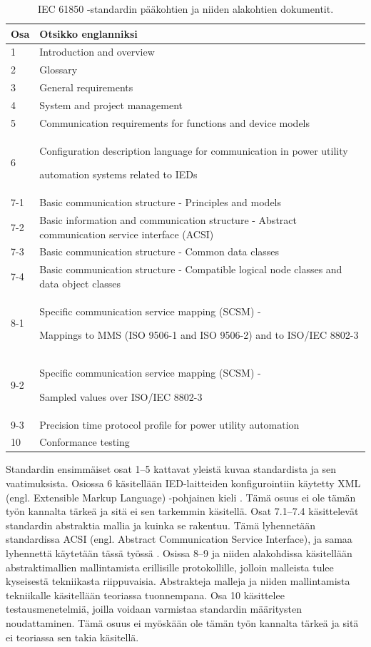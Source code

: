 \begin{table}[ht!]
	\caption{IEC 61850 -standardin pääkohtien ja niiden alakohtien dokumentit.}
	\label{tab:iec61850-dokumentin-osat}
	\begin{tabular}{l | l}
		\hline
		\textbf{Osa} & \textbf{Otsikko englanniksi} \\
		\hline \hline
		1 & Introduction and overview \\
		2 & Glossary \\
		3 & General requirements \\
		4 & System and project management \\
		5 & \parbox[t]{13cm}{Communication requirements for functions and device models} \\
		6 & \parbox[t]{13cm}{Configuration description language for communication in power utility \par automation systems related to IEDs} \\
		7-1 & \parbox[t]{13cm}{Basic communication structure - Principles and models} \\
		7-2 & \parbox[t]{13cm}{Basic information and communication structure - Abstract communication service interface (ACSI)} \\
		7-3 & \parbox[t]{13cm}{Basic communication structure - Common data classes} \\
		7-4 & \parbox[t]{13cm}{Basic communication structure - Compatible logical node classes and data object classes} \\
		8-1 & \parbox[t]{13cm}{Specific communication service mapping (SCSM) - \par  Mappings to MMS (ISO 9506-1 and ISO 9506-2) and to ISO/IEC 8802-3} \\
		9-2 & \parbox[t]{13cm}{Specific communication service mapping (SCSM) - \par  Sampled values over ISO/IEC 8802-3} \\
		9-3 & \parbox[t]{13cm}{Precision time protocol profile for power utility automation} \\
		10 & Conformance testing \\
		\hline
	\end{tabular}
\end{table}

Standardin ensimmäiset osat 1--5 kattavat yleistä kuvaa standardista ja sen vaatimuksista. Osiossa 6 käsitellään IED-laitteiden konfigurointiin käytetty XML (engl. Extensible Markup Language) -pohjainen kieli \cite[s.~7--8]{IEC61850-6}. Tämä osuus ei ole tämän työn kannalta tärkeä ja sitä ei sen tarkemmin käsitellä. Osat 7.1--7.4 käsittelevät standardin abstraktia mallia ja kuinka se rakentuu. Tämä lyhennetään standardissa ACSI (engl. Abstract Communication Service Interface), ja samaa lyhennettä käytetään tässä työssä \cite[s.~72]{IEC61850-7-1}. Osissa 8--9 ja niiden alakohdissa käsitellään abstraktimallien mallintamista erillisille protokollille, jolloin malleista tulee kyseisestä tekniikasta riippuvaisia. Abstrakteja malleja ja niiden mallintamista tekniikalle käsitellään teoriassa tuonnempana. Osa 10 käsittelee testausmenetelmiä, joilla voidaan varmistaa standardin määritysten noudattaminen. Tämä osuus ei myöskään ole tämän työn kannalta tärkeä ja sitä ei teoriassa sen takia käsitellä. \cite[s.~15]{IEC61850-7-1}

